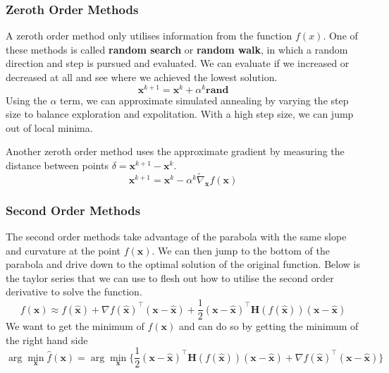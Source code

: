 \documentclass[11pt]{article}
\begin{document}
\subsubsection{Zeroth Order Methods}
A zeroth order method only utilises information from the function $f(x)$.
One of these methods is called \textbf{random search} or \textbf{random walk}, in which a random direction and step is pursued and evaluated.
We can evaluate if we increased or decreased at all and see where we achieved the lowest solution.
\begin{equation}
    \textbf{x}^{k+1} = \textbf{x}^k + \alpha^{k} \textbf{rand}
\end{equation}
Using the $\alpha$ term, we can approximate simulated annealing by varying the step size to balance exploration and expolitation.
With a high step size, we can jump out of local minima.

Another zeroth order method uses the approximate gradient by measuring the distance between points $\delta = \textbf{x}^{k+1} - \textbf{x}^k$.
\begin{equation}
    \textbf{x}^{k+1} = \textbf{x}^k - \alpha^k \tilde{\nabla}_{\textbf{x}} f(\textbf{x})
\end{equation}

\subsubsection{Second Order Methods}
The second order methods take advantage of the parabola with the same slope and curvature at the point $f(\textbf{x})$.
We can then jump to the bottom of the parabola and drive down to the optimal solution of the original function.
Below is the taylor series that we can use to flesh out how to utilise the second order derivative to solve the function.
\begin{equation}
    f(\textbf{x}) \approx f(\hat{\textbf{x}}) + \nabla f (\hat{\textbf{x}})^\top (\textbf{x} - \hat{\textbf{x}}) + \frac{1}{2} (\textbf{x} - \hat{\textbf{x}})^\top \textbf{H}(f(\hat{\textbf{x}})) (\textbf{x} - \hat{\textbf{x}})
\end{equation}
We want to get the minimum of $f(\textbf{x})$ and can do so by getting the minimum of the right hand side
\begin{equation}
    \arg \min_{\textbf{x}} \hat{f}(\textbf{x}) = \arg \min_{\textbf{x}} \{ \frac{1}{2} (\textbf{x} - \hat{\textbf{x}})^\top \textbf{H}(f(\hat{\textbf{x}})) (\textbf{x} - \hat{\textbf{x}}) + \nabla f(\hat{\textbf{x}})^\top (\textbf{x} - \hat{\textbf{x}}) \}
\end{equation}
\end{document}
